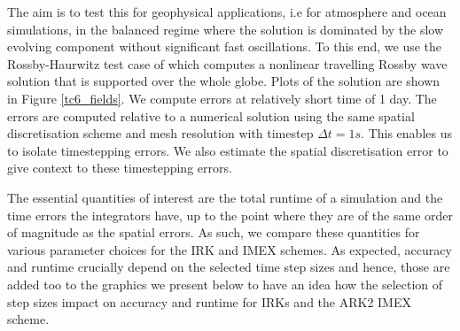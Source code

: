 \documentclass[a4paper, 12pt]{article}
\begin{document}
The aim is to test this for geophysical applications, i.e for
atmosphere and ocean simulations, in the balanced regime where the
solution is dominated by the slow evolving component without
significant fast oscillations. To this end, we use the Rossby-Haurwitz
test case of \cite[Section 6]{WILLIAMSON1992211} which computes a
nonlinear travelling Rossby wave solution that is supported over the
whole globe. Plots of the solution are shown in Figure
\ref{tc6_fields}. We compute errors at relatively short time of 1 day.
The errors are computed relative to a numerical solution using the
same spatial discretisation scheme and mesh resolution with timestep
$\Delta t = 1s$. This enables us to isolate timestepping errors. We
also estimate the spatial discretisation error to give context to
these timestepping errors.

The essential quantities of interest are the total runtime of a
simulation and the time errors the integrators have, up to
the point where they are of the same order of magnitude as the spatial
errors. As such, we compare these quantities for various
parameter choices for the IRK and IMEX
schemes. As expected, accuracy and runtime crucially depend on the
selected time step sizes and hence, those are added too to the
graphics we present below to have an idea how the selection of step
sizes impact on accuracy and runtime for IRKs and the ARK2 IMEX
scheme.
\end{document}
